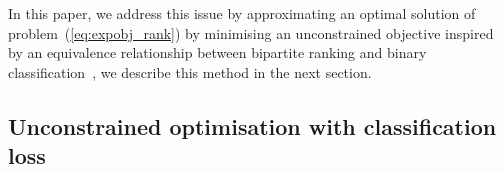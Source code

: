 In this paper, we address this issue by
approximating an optimal solution of problem~(\ref{eq:expobj_rank}) by minimising an unconstrained objective inspired
by an equivalence relationship between bipartite 
ranking and binary classification~\cite{ertekin2011equivalence}, we describe this method in the next section.




\subsection{Unconstrained optimisation with classification loss}


